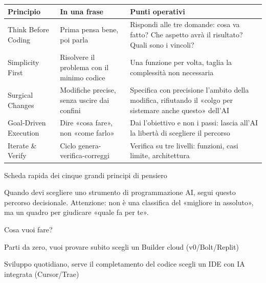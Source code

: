 


\begin{center}
\begin{tabularx}{\linewidth}{|X|X|X|}
\hline
\textbf{Principio} & \textbf{In una frase} & \textbf{Punti operativi} \tabularnewline
\hline
Think Before Coding & Prima pensa bene, poi parla & Rispondi alle tre domande: cosa va fatto? Che aspetto avrà il risultato? Quali sono i vincoli? \tabularnewline
Simplicity First & Risolvere il problema con il minimo codice & Una funzione per volta, taglia la complessità non necessaria \tabularnewline
Surgical Changes & Modifiche precise, senza uscire dai confini & Specifica con precisione l'ambito della modifica, rifiutando il «colgo per sistemare anche questo» dell'AI \tabularnewline
Goal-Driven Execution & Dire «cosa fare», non «come farlo» & Dai l'obiettivo e non i passi: lascia all'AI la libertà di scegliere il percorso \tabularnewline
Iterate \& Verify & Ciclo genera-verifica-correggi & Verifica su tre livelli: funzioni, casi limite, architettura \tabularnewline
\hline
\end{tabularx}
\end{center}

\begin{center}\small\color{gray}Scheda rapida dei cinque grandi principi di pensiero\end{center}


Quando devi scegliere uno strumento di programmazione AI, segui questo percorso decisionale. Attenzione: non è una classifica del «migliore in assoluto», ma un quadro per giudicare «quale fa per te».

Cosa vuoi fare?

Parti da zero, vuoi provare subito scegli un Builder cloud (v0/Bolt/Replit)

Sviluppo quotidiano, serve il completamento del codice scegli un IDE con IA integrata (Cursor/Trae)

